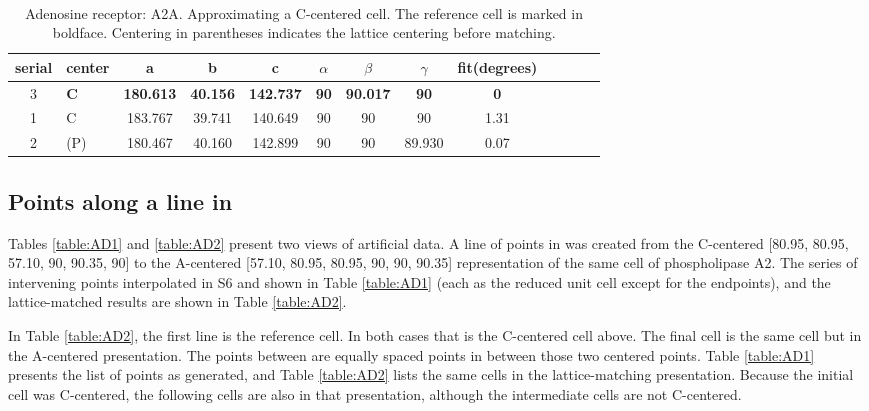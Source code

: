 \documentclass[preprint]{iucr}              %
\numberwithin{equation}{section}
\numberwithin{equation}{section}
\begin{document}
	\begin{table}
		\begin{center}
			\caption{Adenosine receptor: A2A. Approximating a C-centered cell.   The reference cell	is marked in boldface.  Centering in parentheses indicates the lattice centering before matching.}
			~~\\
			
			\begin{tabular}{clccccccccccc}
				\toprule
serial&center& a & b & c & $\alpha$ & $\beta$ & $\gamma$ & fit(degrees) \\
\midrule
				3&	\textbf{C} &  \textbf{180.613} &  \textbf{40.156} & \textbf{142.737} &  \textbf{90} &   \textbf{90.017} &  \textbf{90} &\textbf{0}  \\
			1&	C &  183.767 &  39.741 & 140.649 &  90 &  90 &  90 &1.31 \\
			2&	(P) &  180.467 &  40.160 & 142.899 &  90 &  90 &  89.930 &0.07\\
				\bottomrule
			\end{tabular}
			\label{table:signal3}
		\end{center}
	\end{table}	
	
	
	
	
	\subsection{Points along a line in \SVI}
	Tables \ref{table:AD1} and \ref{table:AD2} present two views of artificial data. 
	A line of points in \SVI{} was created from the C-centered [80.95, 80.95, 57.10, 90, 90.35, 90] 
	to the A-centered [57.10, 80.95, 80.95, 90, 90, 90.35] representation of the same cell of phospholipase A2. The 
	series of intervening points  interpolated in S6 and shown in Table \ref{table:AD1} (each as the reduced unit cell except for the endpoints), 
	and the lattice-matched results are shown
	in Table \ref{table:AD2}.
	
	In Table \ref{table:AD2},
	the first line is the reference cell. In both cases that is the C-centered cell above.
	The final cell is the same cell but in the A-centered presentation. The points between
	are equally spaced points in \SVI{} between those two centered points. Table \ref{table:AD1}
	presents the list of points as generated, and Table \ref{table:AD2} lists the same cells in the lattice-matching
	presentation. Because the initial cell was C-centered, the following cells are also
	in that presentation, although the intermediate cells are not C-centered.
	
\end{document}
